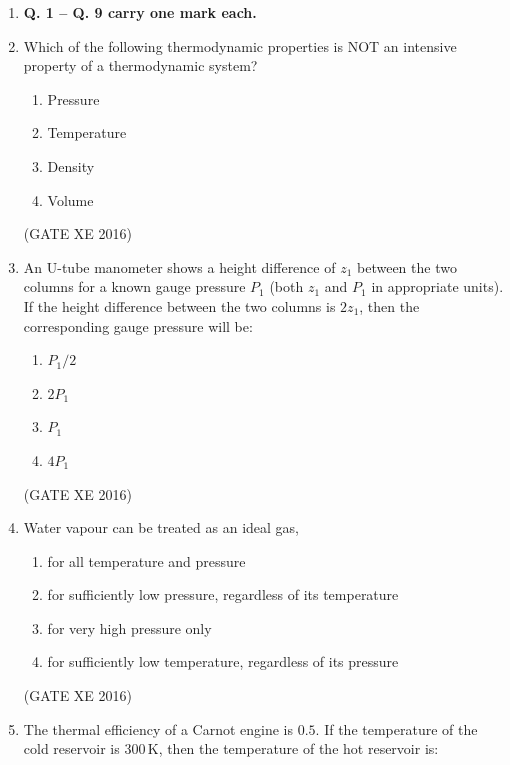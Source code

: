 \documentclass[12pt]{article}
\begin{document}
\begin{enumerate}

\item[] \textbf{Q. 1 – Q. 9 carry one mark each.}

\item Which of the following thermodynamic properties is NOT an intensive property of a thermodynamic system?

\begin{multicols}{2}
\begin{enumerate}
\item Pressure
\item Temperature
\item Density
\item Volume
\end{enumerate}
\end{multicols}

(GATE XE 2016)

\item An U-tube manometer shows a height difference of $z_1$ between the two columns for a known gauge pressure $P_1$ (both $z_1$ and $P_1$ in appropriate units). If the height difference between the two columns is $2z_1$, then the corresponding gauge pressure will be:

\begin{multicols}{4}
\begin{enumerate}
\item $P_1/2$
\item $2P_1$
\item $P_1$
\item $4P_1$
\end{enumerate}
\end{multicols}

(GATE XE 2016)

\item Water vapour can be treated as an ideal gas,

\begin{enumerate}
\item for all temperature and pressure
\item for sufficiently low pressure, regardless of its temperature
\item for very high pressure only
\item for sufficiently low temperature, regardless of its pressure
\end{enumerate}

(GATE XE 2016)

\item The thermal efficiency of a Carnot engine is $0.5$. If the temperature of the cold reservoir is $300 \, \text{K}$, then the temperature of the hot reservoir is:


\end{enumerate}
\end{document}
